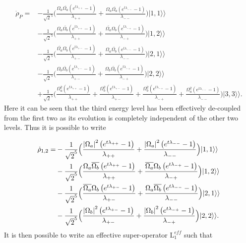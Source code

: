 \documentclass[12pt]{article}
\newcommand{\superket}[1]{|#1\rangle\rangle}
\begin{document}
\begin{align}
    \dot{\rho}_P =& - \frac{1}{\sqrt{2}^5}\Big(\frac{\Omega_a \overline{\Omega_a} \left( {e^{ t { \lambda_{++}}  }}-1\right) }{ { \lambda_{++}}}+\frac{\Omega_a \overline{\Omega_a} \left( {{e}^{ t { \lambda_{--}}  }}-1\right) }{ { \lambda_{--}}}\Big) \superket{1,1} \\
&- \frac{1}{\sqrt{2}^5}\Big(\frac{\Omega_a\overline{\Omega_b} \left( {{e}^{ t { \lambda_{++}}  }}-1\right)  }{ { \lambda_{++}}}+\frac{\overline{\Omega_a}\Omega_b \left( {{e}^{ t { \lambda_{-+}}  }}-1\right)  }{ { \lambda_{-+}}}\Big)\superket{1,2}\nonumber\\
&- \frac{1}{\sqrt{2}^5}\Big(\frac{\overline{\Omega_a} \Omega_b \left( {{e}^{ t { \lambda_{+-}}  }}-1\right) }{ { \lambda_{+-}}}+\frac{\Omega_a \overline{\Omega_b} \left( {{e}^{ t { \lambda_{--}}  }}-1\right) }{ { \lambda_{--}}}\Big)\superket{2,1}\nonumber\\
&- \frac{1}{\sqrt{2}^5}\Big( \frac{\Omega_b \overline{\Omega_b} \left( {{e}^{ t { \lambda_{+-}}  }}-1\right) }{ { \lambda_{+-}}}+\frac{\Omega_b \overline{\Omega_b} \left( {{e}^{ t { \lambda_{-+}}  }}-1\right) }{ { \lambda_{-+}}}\Big)\superket{2,2}\nonumber \\
&+ \frac{1}{\sqrt{2}^5}\Big(\frac{\Omega_a^2 \left( {{e}^{ t { \lambda_{++}}  }}-1\right) }{ { \lambda_{++}}}+\frac{\Omega_b^2\left( {{e}^{ t { \lambda_{+-}}  }}-1\right) }{ { \lambda_{+-}}}+\frac{\Omega_b^2 \left( {{e}^{ t { \lambda_{-+}}  }}-1\right) }{ { \lambda_{-+}}}+\frac{\Omega_a^2\left( {{e}^{ t { \lambda_{--}}  }}-1\right) }{ { \lambda_{--}}}\Big)\superket{3,3}\nonumber.
\end{align} Here it can be seen that the third energy level has been effectively de-coupled from the first two as its evolution is completely independent of the other two levels. Thus it is possible to write

\begin{align}
        \dot{\rho}_{1,2} =& - \frac{1}{\sqrt{2}^5}\Big(\frac{\abs{\Omega_a}^2 \left( {e^{ t { \lambda_{++}}  }}-1\right) }{ { \lambda_{++}}}+\frac{\abs{\Omega_a}^2 \left( {{e}^{ t { \lambda_{--}}  }}-1\right) }{ { \lambda_{--}}}\Big)\superket{1,1} \\
&- \frac{1}{\sqrt{2}^5}\Big(\frac{\Omega_a\overline{\Omega_b} \left( {{e}^{ t { \lambda_{++}}  }}-1\right)  }{ { \lambda_{++}}}+\frac{\overline{\Omega_a}\Omega_b \left( {{e}^{ t { \lambda_{-+}}  }}-1\right)  }{ { \lambda_{-+}}}\Big)\superket{1,2}\nonumber\\
&- \frac{1}{\sqrt{2}^5}\Big(\frac{\overline{\Omega_a} \Omega_b \left( {{e}^{ t { \lambda_{+-}}  }}-1\right) }{ { \lambda_{+-}}}+\frac{\Omega_a \overline{\Omega_b} \left( {{e}^{ t { \lambda_{--}}  }}-1\right) }{ { \lambda_{--}}}\Big)\superket{2,1}\nonumber\\
&- \frac{1}{\sqrt{2}^5}\Big( \frac{\abs{\Omega_b}^2 \left( {{e}^{ t { \lambda_{+-}}  }}-1\right) }{ { \lambda_{+-}}}+\frac{\abs{\Omega_b}^2 \left( {{e}^{ t { \lambda_{-+}}  }}-1\right) }{ { \lambda_{-+}}}\Big)\superket{2,2}\nonumber.
\end{align} It is then possible to write an effective super-operator $\mathrm{L}_1^{eff}$ such that 
\end{document}
